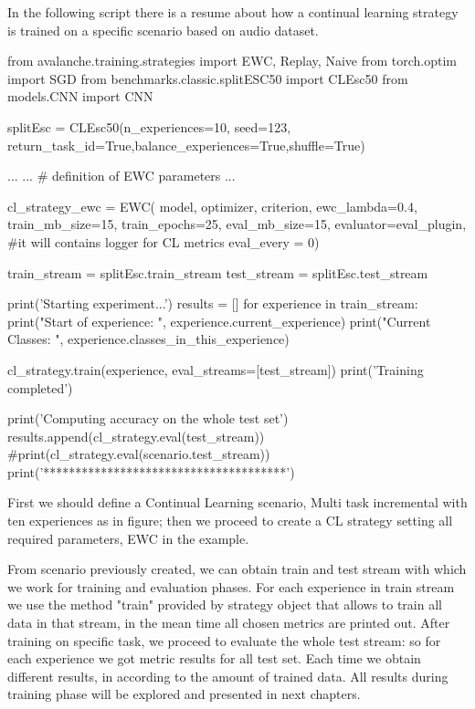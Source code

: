 \documentclass[english, LaM, oneside]{sapthesis}%
\begin{document}
In the following script there is a resume about how a continual learning strategy is trained on a specific scenario based on audio dataset.
\vspace{2mm}
\begin{pythoncode}


from avalanche.training.strategies import EWC, Replay, Naive
from torch.optim import SGD
from benchmarks.classic.splitESC50 import CLEsc50
from models.CNN import CNN

splitEsc =  CLEsc50(n_experiences=10, seed=123,                       
                    return_task_id=True,balance_experiences=True,shuffle=True)

...
... # definition of EWC parameters
...

cl_strategy_ewc = EWC(
            model, optimizer, criterion, ewc_lambda=0.4,
            train_mb_size=15, train_epochs=25, eval_mb_size=15,
            evaluator=eval_plugin, #it will contains logger for CL metrics
            eval_every = 0)


train_stream = splitEsc.train_stream
test_stream = splitEsc.test_stream

print('Starting experiment...')
results = []
for experience in train_stream:
    print("Start of experience: ", experience.current_experience)
    print("Current Classes: ", experience.classes_in_this_experience)

    cl_strategy.train(experience,
                        eval_streams=[test_stream])
    print('Training completed')

    print('Computing accuracy on the whole test set')
    results.append(cl_strategy.eval(test_stream))
    #print(cl_strategy.eval(scenario.test_stream))
    print('**************************************')

\end{pythoncode}
\vspace{5mm}

First we should define a Continual Learning scenario, Multi task incremental with ten experiences as in figure; then we proceed to create a CL strategy setting all required parameters, EWC in the example.

From scenario previously created, we can obtain train and test stream with which we work for training and evaluation phases. For each experience in train stream we use the method "train" provided by strategy object that allows to train all data in that stream, in the mean time all chosen metrics are printed out. 
After training on specific task, we proceed to evaluate the whole test stream: so for each experience we got metric results for all test set. Each time we obtain different results, in according to the amount of trained data. All results during training phase will be explored and presented in next chapters.
\end{document}
